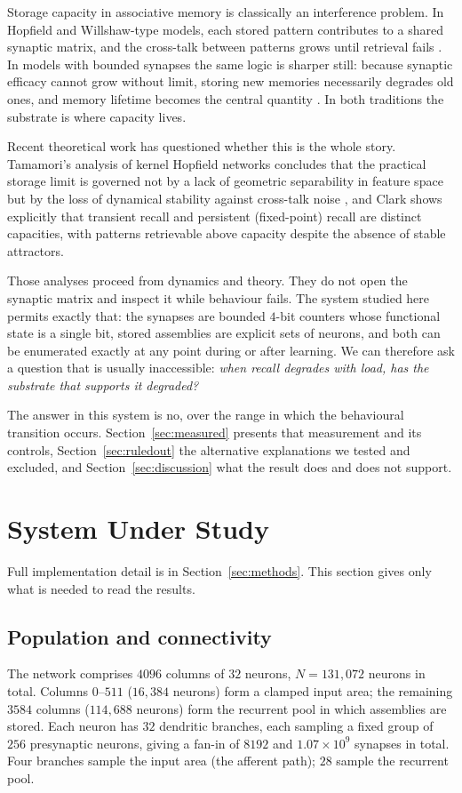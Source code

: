\documentclass[10pt,twocolumn,a4paper]{article}
\begin{document}
Storage capacity in associative memory is classically an interference problem. In
Hopfield and Willshaw-type models, each stored pattern contributes to a shared synaptic
matrix, and the cross-talk between patterns grows until retrieval fails
\cite{knoblauch2010}. In models with bounded synapses the same logic is sharper still:
because synaptic efficacy cannot grow without limit, storing new memories necessarily
degrades old ones, and memory lifetime becomes the central quantity
\cite{fusiabbott2007}. In both traditions the substrate is where capacity lives.

Recent theoretical work has questioned whether this is the whole story. Tamamori's
analysis of kernel Hopfield networks concludes that the practical storage limit is
governed not by a lack of geometric separability in feature space but by the loss of
dynamical stability against cross-talk noise \cite{tamamori2026,tamamori2025}, and Clark
\cite{clark2026} shows explicitly that transient recall and persistent (fixed-point)
recall are distinct capacities, with patterns retrievable above capacity despite the
absence of stable attractors.

Those analyses proceed from dynamics and theory. They do not open the synaptic matrix and
inspect it while behaviour fails. The system studied here permits exactly that: the
synapses are bounded $4$-bit counters whose functional state is a single bit, stored
assemblies are explicit sets of neurons, and both can be enumerated exactly at any point
during or after learning. We can therefore ask a question that is usually inaccessible:
\emph{when recall degrades with load, has the substrate that supports it degraded?}

The answer in this system is no, over the range in which the behavioural transition
occurs. Section~\ref{sec:measured} presents that measurement and its controls,
Section~\ref{sec:ruledout} the alternative explanations we tested and excluded, and
Section~\ref{sec:discussion} what the result does and does not support.

\section{System Under Study}
\label{sec:system}

Full implementation detail is in Section~\ref{sec:methods}. This section gives only what
is needed to read the results.

\subsection{Population and connectivity}
The network comprises $4096$ columns of $32$ neurons, $N = 131{,}072$ neurons in total.
Columns $0$--$511$ ($16{,}384$ neurons) form a clamped input area; the remaining $3584$
columns ($114{,}688$ neurons) form the recurrent pool in which assemblies are stored.
Each neuron has $32$ dendritic branches, each sampling a fixed group of $256$ presynaptic
neurons, giving a fan-in of $8192$ and $1.07\times10^{9}$ synapses in total. Four branches
sample the input area (the afferent path); $28$ sample the recurrent pool.
\end{document}
